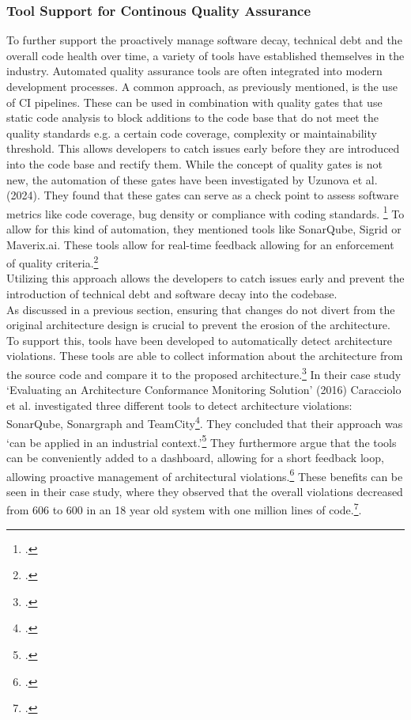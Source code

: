 \subsubsection{Tool Support for Continous Quality Assurance}
To further support the proactively manage software decay, technical debt and the overall code health over time, a variety of tools have established themselves in the industry.
Automated quality assurance tools are often integrated into modern development processes. A common approach, as previously mentioned, is the use of \ac{CI} pipelines. These can be used in combination with quality gates that use static code analysis to block additions to the code base that do not meet the quality standards e.g. a 
certain code coverage, complexity or maintainability threshold. This allows developers to catch issues early before they are introduced into the code base and rectify them. While the concept of quality gates is not new, the automation of these gates have been investigated by Uzunova et al. (2024).
They found that these gates can serve as a check point to assess software metrics like code coverage, bug density or compliance with coding standards. \footcite[8]{uzunovaQualityGatesSoftware2024}
To allow for this kind of automation, they mentioned tools like SonarQube, Sigrid or Maverix.ai. These tools allow for real-time feedback allowing for an enforcement of quality criteria.\footcite[8]{uzunovaQualityGatesSoftware2024}\\
Utilizing this approach allows the developers to catch issues early and prevent the introduction of technical debt and software decay into the codebase.\\

As discussed in a previous section, ensuring that changes do not divert from the original architecture design is crucial to prevent the erosion of the architecture.
To support this, tools have been developed to automatically detect architecture violations. These tools are able to collect information about the architecture from the source code
and compare it to the proposed architecture.\footcite[6]{thomasStaticDynamicArchitecture2017} In their case study 
`Evaluating an Architecture Conformance Monitoring Solution' (2016) Caracciolo et al. investigated three different tools to detect architecture violations:
SonarQube, Sonargraph and TeamCity\footcite[43]{caraccioloEvaluatingArchitectureConformance2016}. They concluded that their approach was 
`can be applied in an industrial context.'\footcite[44]{caraccioloEvaluatingArchitectureConformance2016}
They furthermore argue that the tools can be conveniently added to a dashboard, allowing for a short feedback loop, allowing proactive management of architectural violations.\footcite[44]{caraccioloEvaluatingArchitectureConformance2016}
These benefits can be seen in their case study, where they observed that the overall violations decreased from 606 to 600 in an 18 year old system with one million lines of code.\footcite[43]{caraccioloEvaluatingArchitectureConformance2016}.\\

